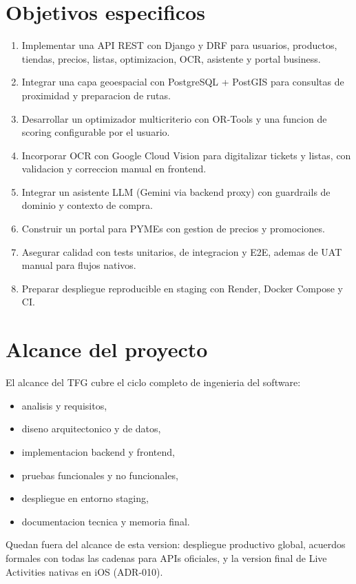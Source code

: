 \section{Objetivos especificos}

\begin{enumerate}
	\item Implementar una API REST con Django y DRF para usuarios, productos, tiendas,
		precios, listas, optimizacion, OCR, asistente y portal business.
	\item Integrar una capa geoespacial con PostgreSQL + PostGIS para consultas de proximidad
		y preparacion de rutas.
	\item Desarrollar un optimizador multicriterio con OR-Tools y una funcion de scoring
		configurable por el usuario.
	\item Incorporar OCR con Google Cloud Vision para digitalizar tickets y listas,
		con validacion y correccion manual en frontend.
	\item Integrar un asistente LLM (Gemini via backend proxy) con guardrails de dominio
		y contexto de compra.
	\item Construir un portal para PYMEs con gestion de precios y promociones.
	\item Asegurar calidad con tests unitarios, de integracion y E2E, ademas de UAT
		manual para flujos nativos.
	\item Preparar despliegue reproducible en staging con Render, Docker Compose y CI.
\end{enumerate}

\section{Alcance del proyecto}

El alcance del TFG cubre el ciclo completo de ingenieria del software:

\begin{itemize}
	\item analisis y requisitos,
	\item diseno arquitectonico y de datos,
	\item implementacion backend y frontend,
	\item pruebas funcionales y no funcionales,
	\item despliegue en entorno staging,
	\item documentacion tecnica y memoria final.
\end{itemize}

Quedan fuera del alcance de esta version: despliegue productivo global,
acuerdos formales con todas las cadenas para APIs oficiales, y la version final
de Live Activities nativas en iOS (ADR-010).

